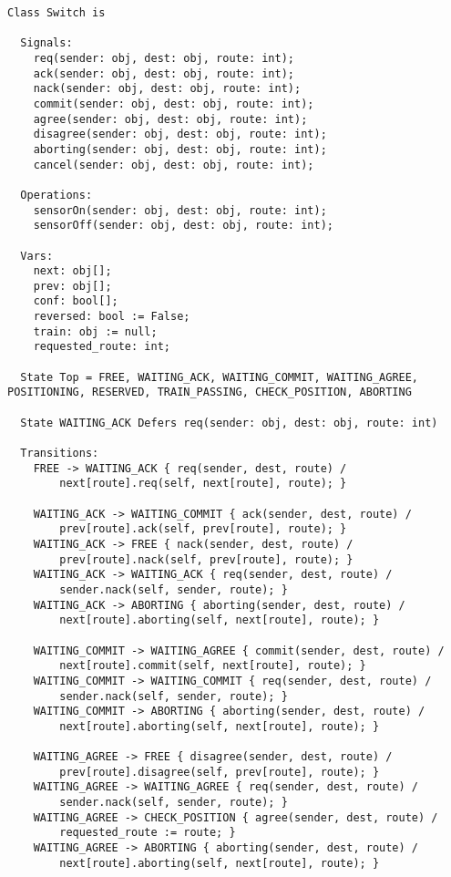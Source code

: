\begin{lstlisting}[caption={modello della classe Switch}]
Class Switch is

  Signals:
    req(sender: obj, dest: obj, route: int);        
    ack(sender: obj, dest: obj, route: int);
    nack(sender: obj, dest: obj, route: int);
    commit(sender: obj, dest: obj, route: int);
    agree(sender: obj, dest: obj, route: int);
    disagree(sender: obj, dest: obj, route: int);
    aborting(sender: obj, dest: obj, route: int);
    cancel(sender: obj, dest: obj, route: int);

  Operations:
    sensorOn(sender: obj, dest: obj, route: int);  
    sensorOff(sender: obj, dest: obj, route: int);

  Vars:
    next: obj[];             
    prev: obj[];             
    conf: bool[];
    reversed: bool := False; 
    train: obj := null;      
    requested_route: int;         

  State Top = FREE, WAITING_ACK, WAITING_COMMIT, WAITING_AGREE, POSITIONING, RESERVED, TRAIN_PASSING, CHECK_POSITION, ABORTING
  
  State WAITING_ACK Defers req(sender: obj, dest: obj, route: int)

  Transitions:
    FREE -> WAITING_ACK { req(sender, dest, route) / 
    	next[route].req(self, next[route], route); }

    WAITING_ACK -> WAITING_COMMIT { ack(sender, dest, route) / 
    	prev[route].ack(self, prev[route], route); }
    WAITING_ACK -> FREE { nack(sender, dest, route) / 
    	prev[route].nack(self, prev[route], route); }
    WAITING_ACK -> WAITING_ACK { req(sender, dest, route) / 
    	sender.nack(self, sender, route); }
    WAITING_ACK -> ABORTING { aborting(sender, dest, route) / 
    	next[route].aborting(self, next[route], route); }

    WAITING_COMMIT -> WAITING_AGREE { commit(sender, dest, route) / 
    	next[route].commit(self, next[route], route); }
    WAITING_COMMIT -> WAITING_COMMIT { req(sender, dest, route) / 
    	sender.nack(self, sender, route); }
    WAITING_COMMIT -> ABORTING { aborting(sender, dest, route) / 
    	next[route].aborting(self, next[route], route); }

    WAITING_AGREE -> FREE { disagree(sender, dest, route) / 
    	prev[route].disagree(self, prev[route], route); }
    WAITING_AGREE -> WAITING_AGREE { req(sender, dest, route) / 
    	sender.nack(self, sender, route); }
    WAITING_AGREE -> CHECK_POSITION { agree(sender, dest, route) / 
    	requested_route := route; }
    WAITING_AGREE -> ABORTING { aborting(sender, dest, route) / 
    	next[route].aborting(self, next[route], route); }


\end{lstlisting}

